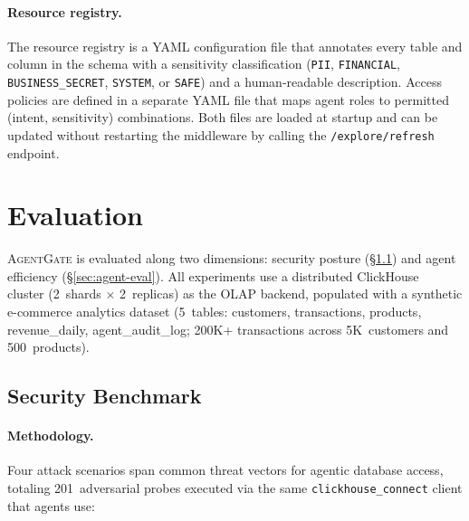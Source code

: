 \documentclass[sigconf, nonacm]{acmart}
\newcommand{\sysname}{\textsc{AgentGate}\xspace}  %
\begin{document}
\paragraph{Resource registry.}
The resource registry is a YAML configuration file that annotates every table
and column in the schema with a sensitivity classification (\texttt{PII},
\texttt{FINANCIAL}, \texttt{BUSINESS\_SECRET}, \texttt{SYSTEM}, or
\texttt{SAFE}) and a human-readable description.  Access policies are
defined in a separate YAML file that maps agent roles to permitted
(intent, sensitivity) combinations.  Both files are loaded at startup and
can be updated without restarting the middleware by calling the
\texttt{/explore/refresh} endpoint.


\section{Evaluation}
\label{sec:eval}

\sysname is evaluated along two dimensions: security posture
(\S\ref{sec:security-eval}) and agent efficiency
(\S\ref{sec:agent-eval}).  All experiments use a distributed
ClickHouse~\cite{clickhouse2024} cluster (2~shards $\times$ 2~replicas) as
the OLAP backend, populated with a synthetic e-commerce analytics
dataset (5~tables: customers, transactions, products, revenue\_daily,
agent\_audit\_log; 200K+ transactions across 5K~customers and
500~products).

\subsection{Security Benchmark}
\label{sec:security-eval}

\paragraph{Methodology.}
Four attack scenarios span common threat vectors for agentic database access,
totaling 201~adversarial probes executed via the same
\texttt{clickhouse\_connect} client that agents use:
\end{document}
